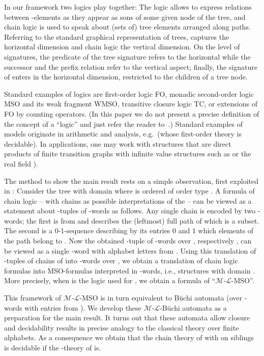 \documentclass[copyright,creativecommons]{eptcs}
\theoremstyle{plain}
\theoremstyle{nonumberplain}
\newcommand{\m}{\ensuremath{\mathcal{M}}}
\newcommand{\el}{\ensuremath{\mathcal{L}}}
\newcommand{\ml}{\ensuremath{\m\textrm{-}\el}}
\begin{document}
In our framework two logics play together: The logic  
allows to express relations between -elements as they appear as sons 
of some given node of the tree, and chain logic is used to speak about (sets of) 
tree elements arranged along paths. Referring to the standard graphical representation
of trees,  captures the horizontal dimension and chain logic the vertical 
dimension. On the level of signatures, the predicate  of the tree signature
refers to the horizontal while the successor and the prefix relation refer to the vertical aspect; 
finally,  the signature of  enters in the horizontal dimension, restricted to the 
children of a tree node. 

Standard examples of logics  are first-order logic FO, monadic second-order logic MSO 
and its weak fragment WMSO, transitive closure logic TC, or extensions of FO by counting 
operators. (In this paper we do not present a precise definition of the concept of a ``logic'' and just refer the reader to~\cite{eft07}.) Standard examples of models  originate in arithmetic and analysis, e.g.\   
 (whose
first-order theory is decidable). In 
applications, one may work with structures  that are 
direct products of finite transition graphs with infinite value structures such as 
  or the real field ). 

The method to show the main result rests on a simple observation, first exploited 
in \cite{tho90}: Consider the tree with domain  where  is ordered of order type . 
A formula  of chain logic -- with chains  
as possible interpretations of the  -- can be viewed as a statement about 
-tuples of -words as follows. 
Any single chain  is encoded by two -words; the 
first is from  and describes the (leftmost) full path of which
 is a subset. The second is a 0-1-sequence describing by its entries 0 and 1 
which elements of the path belong to . Now the obtained  -tuple  of -words 
over , respectively , can be viewed as a single -word 
with alphabet letters from . Using this translation 
of -tuples of chains of  into -words over , 
we obtain a translation of 
chain logic formulas into MSO-formulas interpreted in -words, i.e., 
structures with domain . More precisely, when  is the logic 
used for , we obtain a formula of ``\ml-MSO''. 

This framework of \ml-MSO is in turn equivalent to B\"uchi automata (over 
-words with entries from ). We develop these 
\ml-B\"uchi automata as a preparation for the main result. 
 It turns out that these automata allow 
closure and decidability results in precise analogy to the classical 
theory over finite alphabets. As a consequence we obtain that the chain theory of  with  on siblings is decidable if the -theory of  is. 
\end{document}

